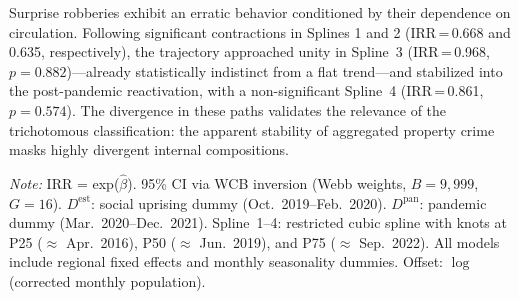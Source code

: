 \documentclass[pdflatex,sn-basic]{sn-jnl}
\newcommand{\tablenote}[1]{%
  \vspace{2pt}%
  {\par\footnotesize\textit{Note:} #1\par}%
}
\begin{document}
Surprise robberies exhibit an erratic behavior conditioned by their dependence on circulation. Following significant contractions in Splines 1 and 2 (IRR\,=\,0.668 and 0.635, respectively), the trajectory approached unity in Spline~3 (IRR\,=\,0.968, $p=0.882$)---already statistically indistinct from a flat trend---and stabilized into the post-pandemic reactivation, with a non-significant Spline~4 (IRR\,=\,0.861, $p=0.574$). The divergence in these paths validates the relevance of the trichotomous classification: the apparent stability of aggregated property crime masks highly divergent internal compositions.

\begin{table}[htbp]
\centering
\caption{Poisson-QMLE model with Wild Cluster Bootstrap: main results (C3)}
\label{tab:poisson}
\footnotesize
{}
\tablenote{IRR = exp($\hat{\beta}$). 95\% CI via WCB inversion (Webb weights, $B=9,999$, $G=16$). $D^{\text{est}}$: social uprising dummy (Oct.\ 2019--Feb.\ 2020). $D^{\text{pan}}$: pandemic dummy (Mar.\ 2020--Dec.\ 2021). Spline~1--4: restricted cubic spline with knots at P25 ($\approx$ Apr.\ 2016), P50 ($\approx$ Jun.\ 2019), and P75 ($\approx$ Sep.\ 2022). All models include regional fixed effects and monthly seasonality dummies. Offset: $\log$(corrected monthly population).}
\end{table}
\end{document}
